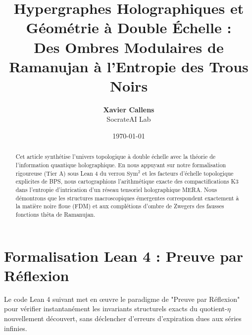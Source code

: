 \documentclass[11pt,a4paper]{article}
\title{\textbf{Hypergraphes Holographiques et Géométrie à Double Échelle : \\ 
Des Ombres Modulaires de Ramanujan à l'Entropie des Trous Noirs}}
\author{\textbf{Xavier Callens} \\ SocrateAI Lab}
\date{\today}
\begin{document}
\maketitle

\begin{abstract}
Cet article synthétise l'univers topologique à double échelle avec la théorie de l'information quantique holographique. En nous appuyant sur notre formalisation rigoureuse (Tier A) sous Lean 4 du verrou $\text{Sym}^2$ et les facteurs d'échelle topologique explicites de BPS, nous cartographions l'arithmétique exacte des compactifications K3 dans l'entropie d'intrication d'un réseau tensoriel holographique MERA. Nous démontrons que les structures macroscopiques émergentes correspondent exactement à la matière noire floue (FDM) et aux complétions d'ombre de Zwegers des fausses fonctions thêta de Ramanujan.
\end{abstract}






\newpage
\appendix
\section{Formalisation Lean 4 : Preuve par Réflexion}
Le code Lean 4 suivant met en œuvre le paradigme de "Preuve par Réflexion" pour vérifier instantanément les invariants structurels exacts du quotient-$\eta$ nouvellement découvert, sans déclencher d'erreurs d'expiration dues aux séries infinies.
\end{document}
